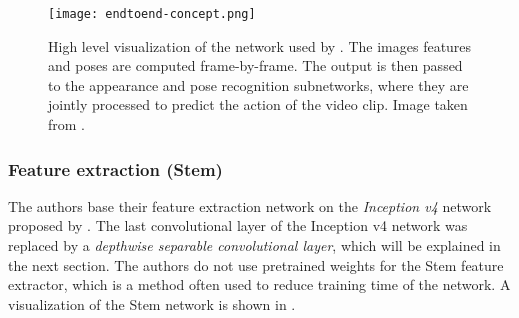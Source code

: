 \begin{figure}[htb!]
    \centering
    \texttt{[image: endtoend-concept.png]}
    \caption{High level visualization of the network used by \cite{luvizon_2d/3d_2018}. The images features and poses are computed frame-by-frame. The output is then passed to the appearance and pose recognition subnetworks, where they are jointly processed to predict the action of the video clip. Image taken from \cite{luvizon_2d/3d_2018}.}
    \label{fig:luvizon_overview}
\end{figure}

\subsubsection{Feature extraction (Stem)}
The authors base their feature extraction network on the \textit{Inception v4} network proposed by \cite{szegedy_inception-v4_2017}.
The last convolutional layer of the Inception v4 network was replaced by a  \textit{depthwise separable convolutional layer}, which will be explained in the next section.
The authors do not use pretrained weights for the Stem feature extractor, which is a method often used to reduce training time of the network.
A visualization of the Stem network is shown in .

